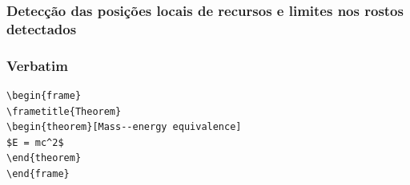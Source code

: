 \documentclass{beamer}
\begin{document}
\begin{frame}
\frametitle{Detecção das posições locais de recursos e limites nos rostos detectados}
\begin{figure}[h]
\centering
{}
\end{figure}

\end{frame}


\begin{frame}[fragile] %
\frametitle{Verbatim}
\begin{example}
\begin{verbatim}
\begin{frame}
\frametitle{Theorem}
\begin{theorem}[Mass--energy equivalence]
$E = mc^2$
\end{theorem}
\end{frame}\end{verbatim}
\end{example}
\end{frame}
\end{document}
